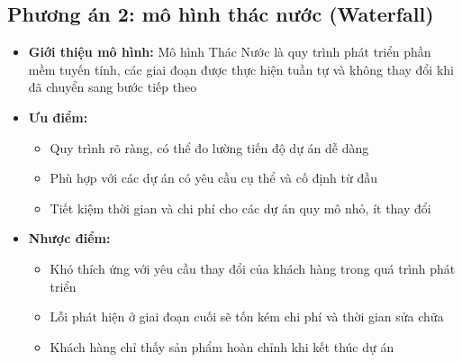 \subsection{Phương án 2: mô hình thác nước (Waterfall)}
\begin{itemize}
    \item \textbf{Giới thiệu mô hình:} Mô hình Thác Nước là quy trình phát triển phần mềm tuyến tính, các giai đoạn được thực hiện tuần tự và không thay đổi khi đã chuyển sang bước tiếp theo
    \item \textbf{Ưu điểm:}
    \begin{itemize}
        \item Quy trình rõ ràng, có thể đo lường tiến độ dự án dễ dàng
        \item Phù hợp với các dự án có yêu cầu cụ thể và cố định từ đầu
        \item Tiết kiệm thời gian và chi phí cho các dự án quy mô nhỏ, ít thay đổi
    \end{itemize}
    \item \textbf{Nhược điểm:} 
    \begin{itemize}
        \item Khó thích ứng với yêu cầu thay đổi của khách hàng trong quá trình phát triển
        \item Lỗi phát hiện ở giai đoạn cuối sẽ tốn kém chi phí và thời gian sửa chữa
        \item Khách hàng chỉ thấy sản phẩm hoàn chỉnh khi kết thúc dự án
    \end{itemize}
\end{itemize}
